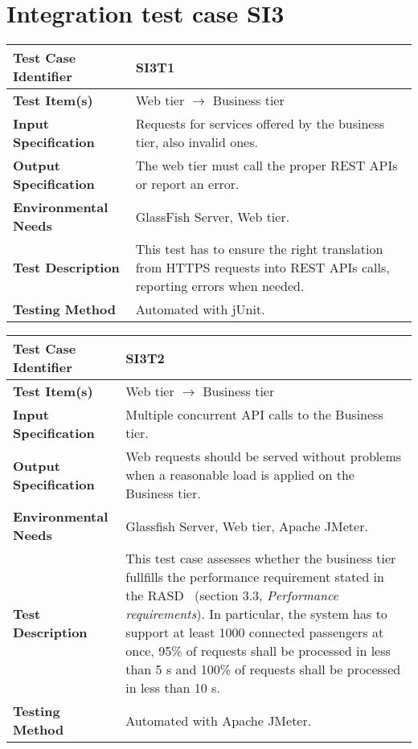 \vspace{2em}

\section{Integration test case SI3}

\begin{tabular}{l p{}}
    \hline
    \textbf{Test Case Identifier} & SI3T1\\
    \hline
    \textbf{Test Item(s)} & Web tier $\rightarrow$ Business tier\\
    \hline
    \textbf{Input Specification} & Requests for services offered by the business tier, also invalid ones.\\
    \hline
    \textbf{Output Specification} & The web tier must call the proper REST APIs or report an error. \\
    \hline
    \textbf{Environmental Needs} & GlassFish Server, Web tier.\\
    \hline
    \textbf{Test Description} & This test has to ensure the right translation from HTTPS requests into REST APIs calls, reporting errors when needed.\\
    \hline
    \textbf{Testing Method} & Automated with jUnit. \\
    \hline
\end{tabular}

\vspace{2em}

\noindent\begin{tabular}{l p{}}
    \hline
    \textbf{Test Case Identifier} & SI3T2\\
    \hline
    \textbf{Test Item(s)} & Web tier $\rightarrow$ Business tier\\
    \hline
    \textbf{Input Specification} & Multiple concurrent API calls to the Business tier.\\
    \hline
    \textbf{Output Specification} & Web requests should be served without problems when a reasonable load is applied on the Business tier. \\
    \hline
    \textbf{Environmental Needs} & Glassfish Server, Web tier, Apache JMeter.\\
    \hline
    \textbf{Test Description} & This test case assesses whether the business tier fullfills the performance requirement stated in the RASD~\cite{mytaxi-rasd} (section 3.3, \emph{Performance requirements}). In particular, the system has to support at least 1000 connected passengers at once, 95\% of requests shall be processed in less than 5 s and 100\% of requests shall be processed in less than 10 s.\\
    \hline
    \textbf{Testing Method} & Automated with Apache JMeter. \\
    \hline
\end{tabular}


